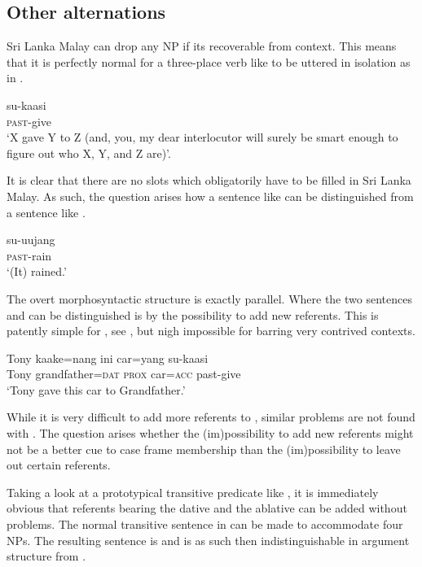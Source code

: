 \documentclass[a4paper,10pt]{article}
\begin{document}
\subsection{Other alternations}
 
Sri Lanka Malay can drop any NP if its recoverable from context. This means that it is perfectly normal for a three-place verb like  to be uttered in isolation as in .

\ea \label{ex:prodrop:kaasi}
\gll su-kaasi\\
 \textsc{past}-give\\
`X gave Y to Z (and, you, my dear interlocutor will surely be smart enough to figure out who X, Y, and Z are)'.
 \z

It is clear that there are no slots which obligatorily have to be filled in Sri Lanka Malay. As such, the question arises how a sentence like  can be distinguished from a sentence like .

\ea\label{ex:prodrop:uujang}
\gll su-uujang\\
   \textsc{past}-rain\\
  `(It) rained.'
\z

The overt morphosyntactic structure is exactly parallel. Where the two sentences  and  can be distinguished is by the possibility to add new referents. This is patently simple for , see , but nigh impossible for  barring very contrived contexts.

\ea\label{ex:prodrop:kaasi:extrareferents}
\gll Tony kaake=nang ini car=yang su-kaasi\\
   Tony grandfather=\textsc{dat}  \textsc{prox} car=\textsc{acc} past-give\\
`Tony gave this car to Grandfather.'
\z

While it is very difficult to add more referents to , similar problems are not found with . The question arises whether the (im)possibility to add new referents might not be a better cue to case frame membership than the (im)possibility to leave out certain referents.

Taking a look at a prototypical transitive predicate like , it is immediately obvious that referents bearing the dative and the ablative can be added without problems. The normal transitive sentence in  can be made to accommodate four NPs. The resulting sentence is   and is as such then indistinguishable in argument structure from .
\end{document}
